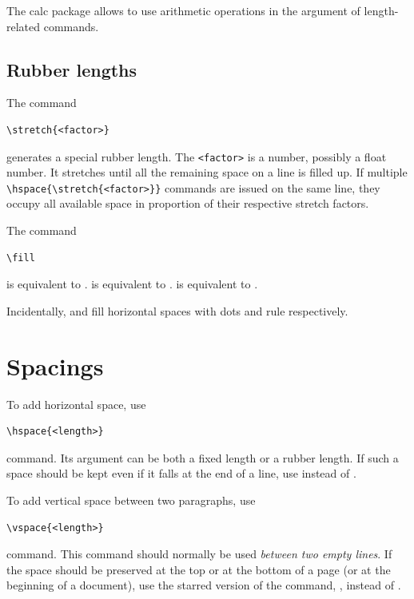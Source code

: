 \documentclass[a4paper,oneside]{book}
\newcommand{\package}[1]{\textsf{#1}}
\newcommand{\syntax}[1]{\PVerb{#1}}
\newcommand{\command}[1]{\PVerb{#1}}
\begin{document}
The \package{calc} package allows to use arithmetic operations in the argument of length-related commands.

\section{Rubber lengths}
The command
\begin{lstlisting}
\stretch{<factor>}
\end{lstlisting}
generates a special rubber length. The \lstinline|<factor>| is a number, possibly a float number. It stretches until all the remaining space on a line is filled up. If multiple \lstinline|\hspace{\stretch{<factor>}}| commands are issued on the same line, they occupy all available space in proportion of their respective stretch factors.

The command
\begin{lstlisting}
\fill 
\end{lstlisting}
is equivalent to \syntax{\stretch{1}}. \command{\hfill} is equivalent to \command{\hspace{\fill}}. \command{\vfill} is equivalent to \command{\vspace{\fill}}.

Incidentally, \command{\dotfill} and \command{\hrulefill} fill horizontal spaces with dots and rule respectively.

\chapter{Spacings}
To add horizontal space, use
\begin{lstlisting}
\hspace{<length>}
\end{lstlisting}
command. Its argument can be both a fixed length or a rubber length. If such a space should be kept even if it falls at the end of a line, use \syntax{\hspace*} instead of \syntax{\hspace}.

To add vertical space between two paragraphs, use
\begin{lstlisting}
\vspace{<length>}
\end{lstlisting}
command. This command should normally be used \emph{between two empty lines}. If the space should be preserved at the top or at the bottom of a page (or at the beginning of a document), use the starred version of the command, \syntax{\vspace*}, instead of \syntax{\vspace}.
\end{document}

